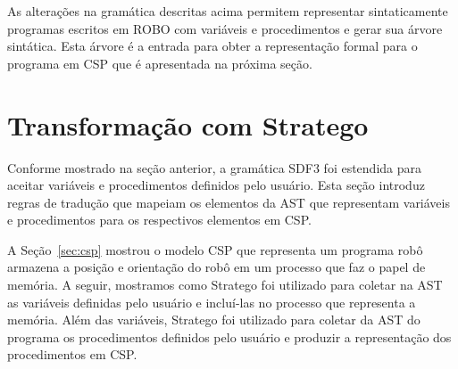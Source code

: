 As alterações na gramática descritas acima permitem representar sintaticamente programas escritos em ROBO com variáveis e procedimentos e gerar sua árvore sintática. Esta árvore é a entrada para obter a representação formal para o programa em CSP que é apresentada na próxima seção.

\section{Transformação com Stratego}



Conforme mostrado na seção anterior, a gramática SDF3 foi estendida para aceitar variáveis e procedimentos definidos pelo usuário. Esta seção introduz regras de tradução que mapeiam os elementos da AST que representam variáveis e procedimentos para os respectivos elementos em CSP. 

A Seção~\ref{sec:csp} mostrou o modelo CSP que representa um programa robô armazena a posição e orientação do robô em um processo que faz o papel de memória. A seguir, mostramos como Stratego foi utilizado para coletar na AST as variáveis definidas pelo usuário e incluí-las no processo que representa a memória. Além das variáveis, Stratego foi utilizado para coletar da AST do programa os procedimentos definidos pelo usuário e produzir a representação dos procedimentos em CSP.

